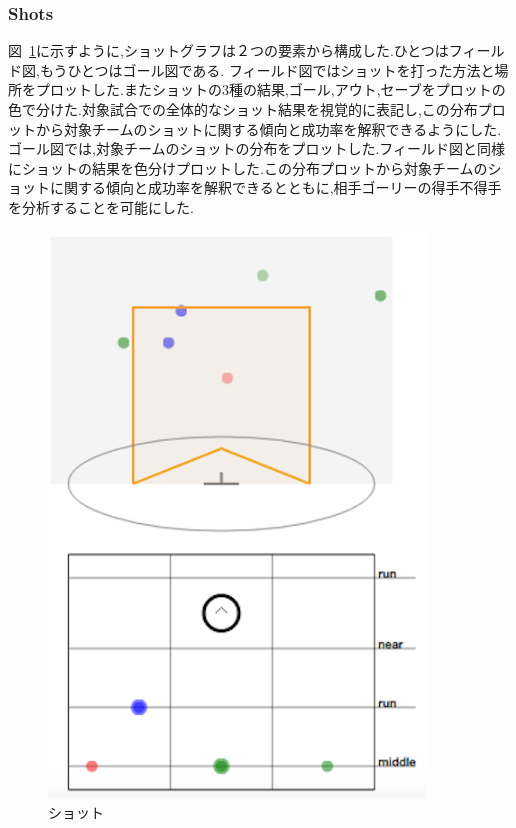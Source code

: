 \documentclass[sotsuron]{kuee}
\begin{document}
			\subsubsection{Shots}
				図~\ref{fig:shots}に示すように,ショットグラフは２つの要素から構成した.ひとつはフィールド図,もうひとつはゴール図である.
				フィールド図ではショットを打った方法と場所をプロットした.またショットの3種の結果,ゴール,アウト,セーブをプロットの色で分けた.対象試合での全体的なショット結果を視覚的に表記し,この分布プロットから対象チームのショットに関する傾向と成功率を解釈できるようにした.
				ゴール図では,対象チームのショットの分布をプロットした.フィールド図と同様にショットの結果を色分けプロットした.この分布プロットから対象チームのショットに関する傾向と成功率を解釈できるとともに,相手ゴーリーの得手不得手を分析することを可能にした.
					\begin{figure}
						\begin{center}
							\includegraphics[width=10cm]{./png/shots.png}
						\end{center}
						\caption{ショット}
				  		\label{fig:shots}
					\end{figure}
\end{document}
